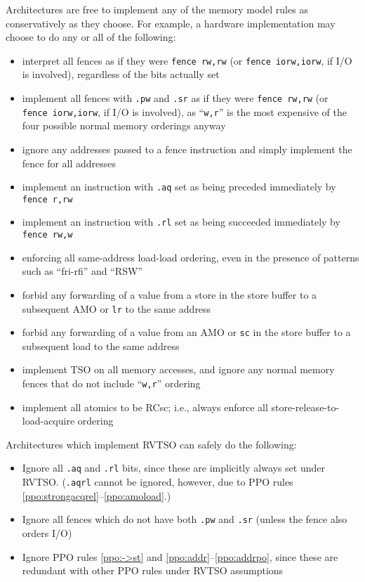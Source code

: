 Architectures are free to implement any of the memory model rules as conservatively as they choose.  For example, a hardware implementation may choose to do any or all of the following:
  \begin{itemize}
    \item interpret all fences as if they were {\tt fence rw,rw} (or {\tt fence iorw,iorw}, if I/O is involved), regardless of the bits actually set
    \item implement all fences with {\tt .pw} and {\tt .sr} as if they were {\tt fence~rw,rw} (or {\tt fence~iorw,iorw}, if I/O is involved), as ``{\tt w,r}'' is the most expensive of the four possible normal memory orderings anyway
    \item ignore any addresses passed to a fence instruction and simply implement the fence for all addresses
    \item implement an instruction with {\tt .aq} set as being preceded immediately by {\tt fence r,rw}
    \item implement an instruction with {\tt .rl} set as being succeeded immediately by {\tt fence rw,w}
    \item enforcing all same-address load-load ordering, even in the presence of patterns such as ``fri-rfi'' and ``RSW''
    \item forbid any forwarding of a value from a store in the store buffer to a subsequent AMO or {\tt lr} to the same address
    \item forbid any forwarding of a value from an AMO or {\tt sc} in the store buffer to a subsequent load to the same address
    \item implement TSO on all memory accesses, and ignore any normal memory fences that do not include ``{\tt w,r}'' ordering
    \item implement all atomics to be RCsc; i.e., always enforce all store-release-to-load-acquire ordering
  \end{itemize}

Architectures which implement RVTSO can safely do the following:
\begin{itemize}
  \item Ignore all {\tt .aq} and {\tt .rl} bits, since these are implicitly always set under RVTSO.  ({\tt .aqrl} cannot be ignored, however, due to PPO rules \ref{ppo:strongacqrel}--\ref{ppo:amoload}.)
  \item Ignore all fences which do not have both {\tt .pw} and {\tt .sr} (unless the fence also orders I/O)
  \item Ignore PPO rules \ref{ppo:->st} and \ref{ppo:addr}--\ref{ppo:addrpo}, since these are redundant with other PPO rules under RVTSO assumptions
\end{itemize}

